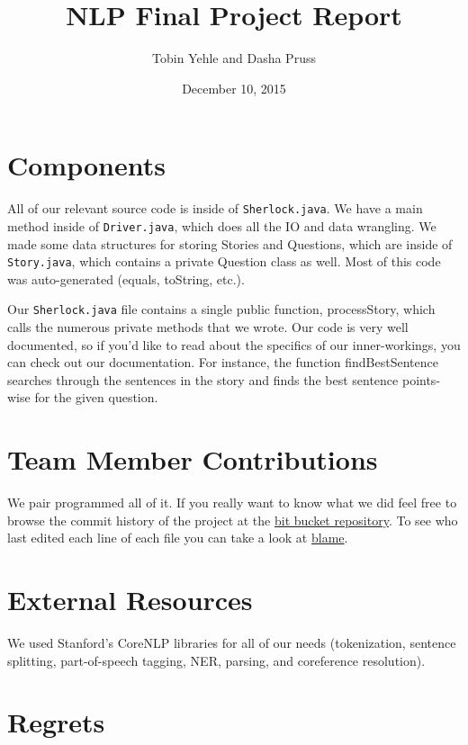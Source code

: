 \documentclass[twoside,12pt]{article}
\newcommand{\class}{NLP}
\newcommand{\name}{Final Project Report}
\newcommand{\due}{December 10, 2015}
\newcommand{\code}[1]{\texttt{#1}}
\begin{document}
\date{\due}
\title{\class{} \name}
\author{ Tobin Yehle and Dasha Pruss }
\maketitle


\section{Components}

All of our relevant source code is inside of \code{Sherlock.java}. We have a main method inside of \code{Driver.java}, which does all the IO and data wrangling. We made some data structures for storing Stories and Questions, which are inside of \code{Story.java}, which contains a private Question class as well. Most of this code was auto-generated (equals, toString, etc.).

Our \code{Sherlock.java} file contains a single public function, processStory, which calls the numerous private methods that we wrote. Our code is very well documented, so if you'd like to read about the specifics of our inner-workings, you can check out our documentation. For instance, the function findBestSentence searches through the sentences in the story and finds the best sentence points-wise for the given question.

\section{Team Member Contributions}
We pair programmed all of it. If you really want to know what we did feel free to browse the commit history of the project at the \href{https://bitbucket.org/tobinyehle/sherlock}{bit bucket repository}. To see who last edited each line of each file you can take a look at \href{https://bitbucket.org/tobinyehle/sherlock/annotate/e57a8467bc90e614b13ca2c99f0b5d681baa65c9/src/cs/utah/sherlock/Sherlock.java?at=default&fileviewer=file-view-default}{blame}.


\section{External Resources}

We used Stanford's CoreNLP libraries for all of our needs (tokenization, sentence splitting, part-of-speech tagging, NER, parsing, and coreference resolution).

\section{Regrets}
\end{document}

